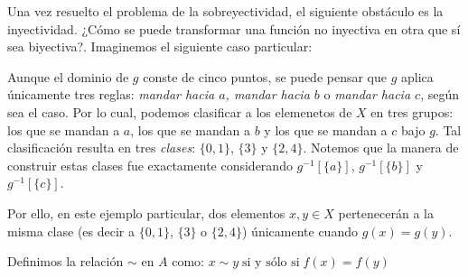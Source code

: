 \documentclass[letterpaper,DIV=14,headsepline,12pt]{scrartcl}
\begin{document}
    Una vez resuelto el problema de la sobreyectividad, el siguiente obstáculo es la inyectividad. ¿Cómo se puede transformar una función no inyectiva en otra que sí sea biyectiva?. Imaginemos el siguiente caso particular:
    \begin{center}
    \end{center}

    Aunque el dominio de $g$ conste de cinco puntos, se puede pensar que $g$ aplica únicamente tres reglas: \textit{mandar hacia $a$, mandar hacia $b$} o \textit{mandar hacia $c$}, según sea el caso. Por lo cual, podemos clasificar a los elemenetos de $X$ en tres grupos: los que se mandan a $a$, los que se mandan a $b$ y los que se mandan a $c$ bajo $g$. Tal clasificación resulta en tres \textit{clases}: $\{0,1\}$, $\{3\}$ y $\{2,4\}$. Notemos que la manera de construir estas clases fue exactamente considerando $g^{-1}[\{a\}]$, $g^{-1}[\{b\}]$ y $g^{-1}[\{c\}]$.

    Por ello, en este ejemplo particular, dos elementos $x,y \in X$ pertenecerán a la misma clase (es decir a $\{0,1\}$, $\{3\}$ o $\{2,4\}$) únicamente cuando $g(x)=g(y)$.

    \begin{definicion}
        Definimos la relación $\sim$ en $A$ como: $ x \sim y \; \text{si y sólo si} \; f(x)=f(y)$
    \end{definicion}
\end{document}
